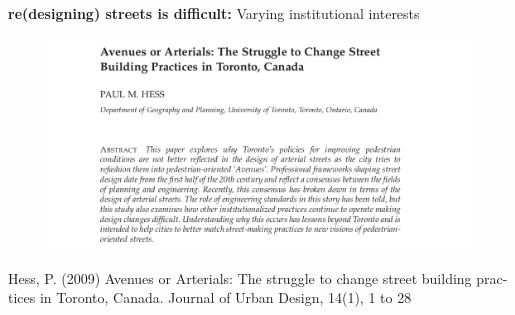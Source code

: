 \documentclass[aspectratio=169]{beamer}
\begin{document}
\begin{frame}
	
	\textbf{re(designing) streets is difficult:} Varying institutional interests
	
	

	\begin{figure}
		\centering
		\includegraphics[width=0.9\linewidth]{images/avenues_or_arterials.png}
	\end{figure}
	
	\tiny{Hess, P. (2009) Avenues or Arterials: The struggle to change street building prac-
		tices in Toronto, Canada. Journal of Urban Design, 14(1), 1 to 28}
	
\end{frame}
\end{document}
